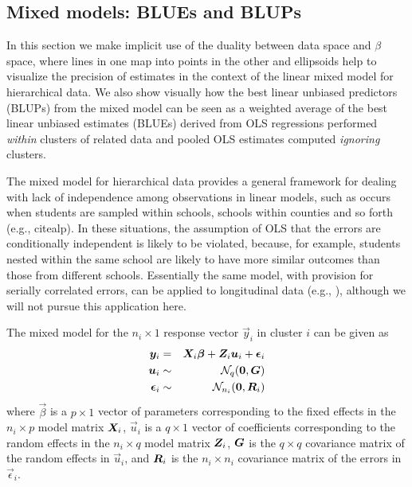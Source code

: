 \subsection{Mixed models: BLUEs and BLUPs}

In this section we make implicit use of the duality between data space and $\beta$
space, where lines in one map into points in the other and ellipsoids help to
visualize the precision of estimates in the context of the linear mixed
model for hierarchical data.  We also show visually how the best linear unbiased
predictors (BLUPs) from the mixed model can be seen as a weighted average
of the best linear unbiased estimates (BLUEs) derived from OLS regressions performed \emph{within} clusters of related data
and pooled OLS estimates computed \emph{ignoring} clusters.

The mixed model for hierarchical data provides a general framework for
dealing with lack of independence among observations in linear models,
such as occurs when students are sampled within schools, schools within
counties and so forth (e.g., citealp{}). In these situations, the assumption of OLS that
the errors are conditionally independent is likely to be violated,
because, for example, students nested within the same school are
likely to have more similar outcomes than those from different schools. Essentially the same model, with provision for serially correlated errors, can be applied to longitudinal data (e.g., \citealp{LairdWare:1982}), although we will not pursue this application here.


The mixed model for the $n_i \times 1$ response vector $\vec{y}_i$ in
cluster $i$ can be given as
\begin{eqnarray}
 \bm{y}_i & = & \bm{X}_i \bm{\beta} + \bm{Z}_i \bm{u}_i + \bm{\epsilon}_i \label{eq:mixed1} \\
 \bm{u}_i & \sim & \mathcal{N}_q (\bm{0}, \bm{G}) \nonumber\\
 \bm{\epsilon}_i & \sim & \mathcal{N}_{n_i} (\bm{0}, \bm{R}_i) \nonumber
\end{eqnarray}
where
$\vec{\beta}$ is a $p \times 1$ vector of parameters corresponding to the fixed effects
in the $n_i \times p$ model matrix $\bm{X}_i$,
$\vec{u}_i$ is a $q \times 1$ vector of coefficients corresponding to the random effects
in the $n_i \times q$ model matrix $\bm{Z}_i$,
$\bm{G}$ is the $q \times q$ covariance matrix of the random effects in $\vec{u}_i$,
and $\bm{R}_i$ is the $n_i \times n_i$ covariance matrix of the errors in $\vec{\epsilon}_i$.

